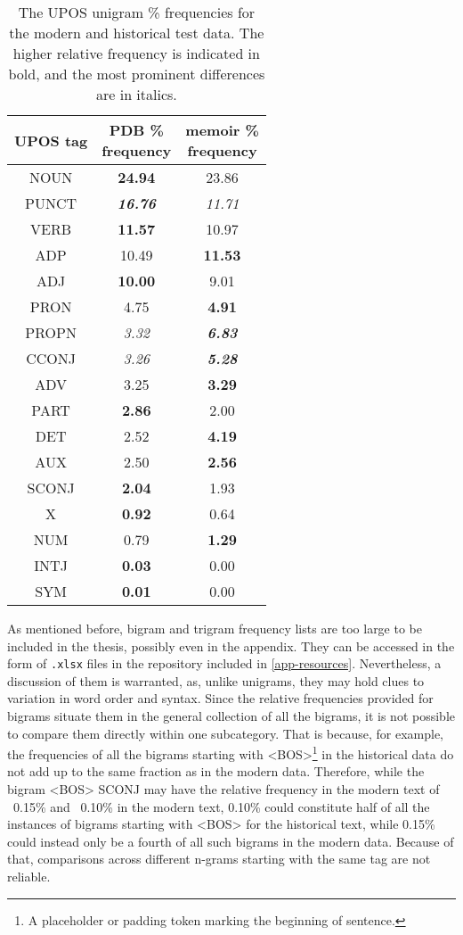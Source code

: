 \renewcommand{\arraystretch}{1.25}
\begin{table}[H]
\begin{center}
\begin{tabular}{|c|cc|}
\hline \bf UPOS tag & \bf \makecell[c]{PDB \% \\ frequency} & \bf \makecell[c]{memoir \% \\ frequency} \\ \hline
NOUN & \textbf{24.94} & 23.86 \\
PUNCT & \textit{\textbf{16.76}} & \textit{11.71} \\
VERB & \textbf{11.57} & 10.97 \\
ADP & 10.49 & \textbf{11.53} \\
ADJ & \textbf{10.00} & 9.01 \\
PRON & 4.75 & \textbf{4.91} \\
PROPN & \textit{3.32} & \textit{\textbf{6.83}} \\
CCONJ & \textit{3.26} & \textit{\textbf{ 5.28}} \\
ADV & 3.25 & \textbf{3.29} \\
PART & \textbf{2.86} & 2.00 \\
DET & 2.52 & \textbf{4.19} \\
AUX & 2.50 & \textbf{2.56} \\
SCONJ & \textbf{2.04} & 1.93 \\
X & \textbf{0.92} & 0.64 \\
NUM & 0.79 & \textbf{1.29} \\
INTJ & \textbf{0.03} & 0.00 \\
SYM & \textbf{0.01} & 0.00 \\
\hline
\end{tabular}
\caption{\label{table:upos-unigrams} The UPOS unigram \% frequencies for the modern and historical test data. The higher relative frequency is indicated in bold, and the most prominent differences are in italics.}
\end{center}
\end{table}

As mentioned before, bigram and trigram frequency lists are too large to be included in the thesis, possibly even in the appendix. They can be accessed in the form of \texttt{.xlsx} files in the repository included in \autoref{app-resources}. Nevertheless, a discussion of them is warranted, as, unlike unigrams, they may hold clues to variation in word order and syntax. Since the relative frequencies provided for bigrams situate them in the general collection of all the bigrams, it is not possible to compare them directly within one subcategory. That is because, for example, the frequencies of all the bigrams starting with <BOS>\footnote{A placeholder or padding token marking the beginning of sentence.} in the historical data do not add up to the same fraction as in the modern data. Therefore, while the bigram <BOS> SCONJ may have the relative frequency in the modern text of ~0.15\% and ~0.10\% in the modern text, 0.10\% could constitute half of all the instances of bigrams starting with <BOS> for the historical text, while 0.15\% could instead only be a fourth of all such bigrams in the modern data. Because of that, comparisons across different n-grams starting with the same tag are not reliable.

